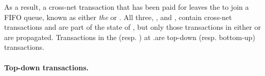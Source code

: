  As a result, a cross-net transaction that has been paid for leaves the \postoffice to join a FIFO queue, known as either \emph{the \bqueue} or \emph{\tqueue}. All three, \postoffice, \bqueue and \tqueue, contain cross-net transactions and are part of the state of \gw, but only those transactions in either \tqueue or \bqueue are propagated. Transactions in the \tqueue (resp. \bqueue) at .\gw are top-down (resp. bottom-up) transactions.



\paragraph{Top-down transactions.}

